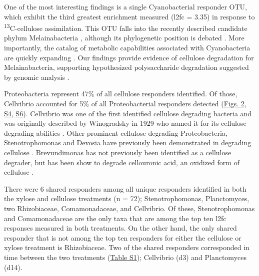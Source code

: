 One of the most interesting findings is a single Cyanobacterial responder OTU, which exhibit the third greatest enrichment measured (l2fc = 3.35) in response to \textsuperscript{13}C-cellulose assimilation. This OTU falls into the recently described candidate phylum Melainabacteria \cite{Di_Rienzi_2013}, although its phylogenetic position is debated \cite{Soo_2014}. More importantly, the catalog of metabolic capabilities associated with Cyanobacteria are quickly expanding \cite{Di_Rienzi_2013, Soo_2014}. Our findings provide evidence of cellulose degradation for Melainabacteria, supporting hypothesized polysaccharide degradation suggested by genomic analysis \cite{Di_Rienzi_2013}.     

Proteobacteria represent 47\% of all cellulose responders identified.  Of those, Cellvibrio accounted for 5\% of all Proteobacterial responders detected (\href{https://www.authorea.com/users/3537/articles/3612/master/file/figures/l2fc_fig1/l2fc_fig.pdf}{Figs. 2}, \href{https://authorea.com/users/3537/articles/8459/master/file/figures/l2fc_fig_pVal/l2fc_fig_pVal.png}{S4}, \href{https://authorea.com/users/3537/articles/8459/master/file/figures/cellulose_resp_profiles/cellulose_resp_profiles.png}{S6}). Cellvibrio was one of the first identified cellulose degrading bacteria and was originally described by Winogradsky in 1929 who named it for its cellulose degrading abilities \cite{boone2001bergeys}. Other prominent cellulose degrading Proteobacteria, Stenotrophomonas and Devosia have previously been demonstrated in degrading cellulose \cite{Trujillo_Cabrera_2012, Verastegui_2014}. Brevundimonas has not previously been identified as a cellulose degrader, but has been show to degrade cellouronic acid, an oxidized form of cellulose \cite{Tavernier_2008}.

There were 6 shared responders among all unique responders identified in both the xylose and cellulose treatments (n = 72); Stenotrophomonas, Planctomyces, two Rhizobiaceae, Comamonadaceae, and Cellvibrio. Of these, Stenotrophomonas and Comamonadaceae are the only taxa that are among the top ten l2fc responses measured in both treatments. On the other hand, the only shared responder that is not among the top ten responders for either the cellulose or xylose treatment is Rhizobiaceae. Two of the shared responders corresponded in time between the two treatments (\href{https://authorea.com/users/3537/articles/8459/master/file/figures/resp_table/resp_table.png}{Table S1}); Cellvibrio (d3) and Planctomyces (d14).  


